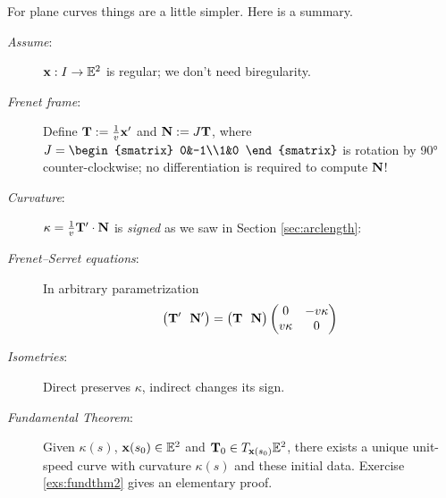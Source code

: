 \begin{minipage}[t]{0.65\linewidth}\vspace{-5pt}
For plane curves things are a little simpler. Here is a summary. 

	\begin{description}
		\item[\normalfont\emph{Assume}:] ${\mathbf{x}}:I\to\mathbb{E}^2$ is regular; we don't need biregularity.
		
		\item[\normalfont\emph{Frenet frame}:] Define ${\mathbf{T}}:=\frac 1{v}{\mathbf{x}}'$ and ${\mathbf{N}}:=J{\mathbf{T}}$, where $J=
		\begin{smatrix}
			0&-1\\1&0	
		\end{smatrix}$ is rotation by \ang{90} counter-clockwise; no differentiation is required to compute ${\mathbf{N}}$!
		
		\item[\normalfont\emph{Curvature}:] $\kappa=\frac 1v{\mathbf{T}}'\cdot{\mathbf{N}}$ is \emph{signed} as we saw in Section \ref{sec:arclength}:
	
		
		\item[\normalfont\emph{Frenet--Serret equations}:] In arbitrary parametrization
		\[
			\bigl(\vT'\ \ \vN'\bigr)
		  =
			\bigl(\vT\ \ \vN\bigr)
			\begin{pmatrix}
				0&-v\kappa\\
				v\kappa&0
			\end{pmatrix}
		\]
		
		\item[\normalfont\emph{Isometries}:] Direct preserves $\kappa$, indirect changes its sign.
		
		\item[\normalfont\emph{Fundamental Theorem}:] Given $\kappa(s)$, ${\mathbf{x}}(s_0)\in\mathbb{E}^2$ and ${\mathbf{T}}_0\in T_{{\mathbf{x}}(s_0)}\mathbb{E}^2$, there exists a unique unit-speed curve with curvature $\kappa(s)$ and these initial data. Exercise \ref{exs:fundthm2} gives an elementary proof.
	\end{description}
\end{minipage}
\hfill
